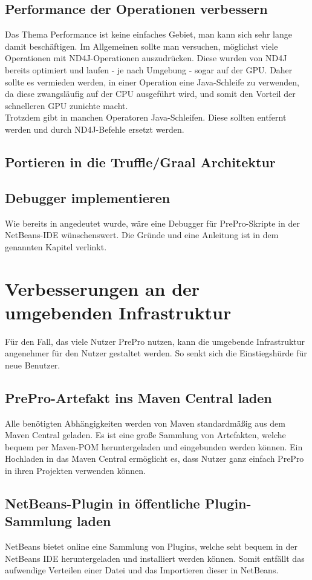\subsection{Performance der Operationen verbessern}
Das Thema Performance ist keine einfaches Gebiet, man kann sich sehr lange damit beschäftigen.
Im Allgemeinen sollte man versuchen, möglichst viele Operationen mit ND4J-Operationen auszudrücken.
Diese wurden von ND4J bereits optimiert und laufen - je nach Umgebung - sogar auf der \ac{GPU}.
Daher sollte es vermieden werden, in einer Operation eine Java-Schleife zu verwenden, da diese zwangsläufig auf der \ac{CPU} ausgeführt wird, und somit den Vorteil der schnelleren \ac{GPU} zunichte macht.\\
Trotzdem gibt in manchen Operatoren Java-Schleifen.
Diese sollten entfernt werden und durch ND4J-Befehle ersetzt werden.

\subsection{Portieren in die Truffle/Graal Architektur}

\subsection{Debugger implementieren}
Wie bereits in  angedeutet wurde, wäre eine Debugger für PrePro-Skripte in der NetBeans-IDE wünschenswert.
Die Gründe und eine Anleitung ist in dem genannten Kapitel verlinkt.

\section{Verbesserungen an der umgebenden Infrastruktur}
Für den Fall, das viele Nutzer PrePro nutzen, kann die umgebende Infrastruktur angenehmer für den Nutzer gestaltet werden.
So senkt sich die Einstiegshürde für neue Benutzer.

\subsection{PrePro-Artefakt ins Maven Central laden}
Alle benötigten Abhängigkeiten werden von Maven standardmäßig aus dem Maven Central geladen.
Es ist eine große Sammlung von Artefakten, welche bequem per Maven-\ac{POM} heruntergeladen und eingebunden werden können.
Ein Hochladen in das Maven Central ermöglicht es, dass Nutzer ganz einfach PrePro in ihren Projekten verwenden können.

\subsection{NetBeans-Plugin in öffentliche Plugin-Sammlung laden}
NetBeans bietet online eine Sammlung von Plugins, welche seht bequem in der NetBeans IDE heruntergeladen und installiert werden können.
Somit entfällt das aufwendige Verteilen einer Datei und das Importieren dieser in NetBeans.

\endinput
